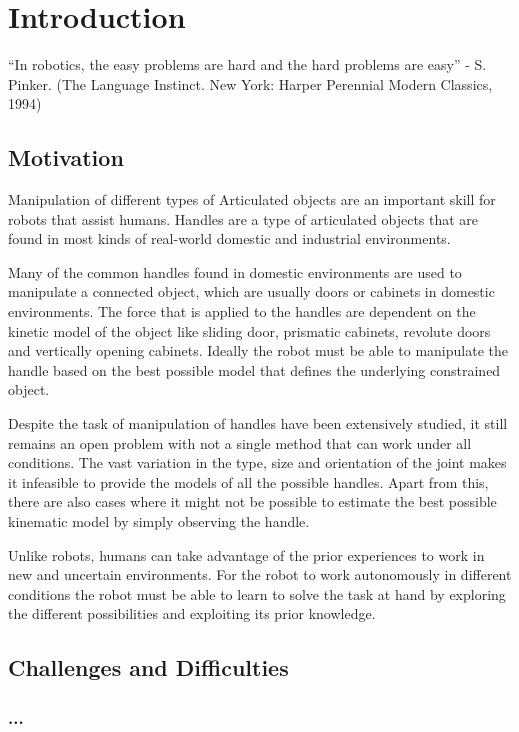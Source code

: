 

    \chapter{Introduction}
    
    “In robotics, the easy problems are hard and the hard problems are easy”  - S. Pinker. 
    (The Language Instinct. New York: Harper Perennial Modern Classics, 1994)

    \section{Motivation}
    Manipulation of different types of Articulated objects are an important skill for robots that assist humans. Handles are a type of articulated objects that are found in most kinds of real-world  domestic and industrial environments.
    
    Many of the common handles found in domestic environments are used to manipulate a connected object, which are usually doors or cabinets in domestic environments. The force that is applied to the handles are dependent on the kinetic model of the object like sliding door, prismatic cabinets, revolute doors and vertically opening cabinets. Ideally the robot must be able to manipulate the handle based on the best possible model that defines the underlying constrained object.
    
    Despite the task of manipulation of handles have been extensively studied, it still remains an open problem with not a single method that can work under all conditions. The vast variation in the type, size and orientation of the joint makes it infeasible to provide the models of all the possible handles. Apart from this, there are also cases where it might not be possible to estimate the best possible kinematic model by simply observing the handle.
    
    Unlike robots, humans can take advantage of the prior experiences to work in new and uncertain environments. For the robot to work autonomously in different conditions the robot must be able to learn to solve the task at hand by exploring the different possibilities and exploiting its prior knowledge.

    \section{Challenges and Difficulties}
    \subsection{...}
    



